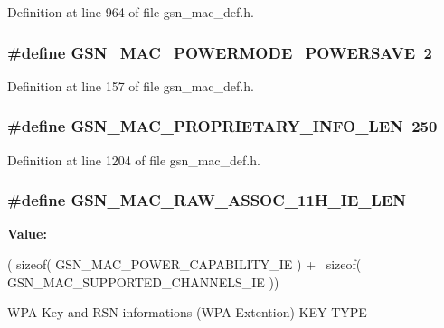 Definition at line 964 of file gsn\_\-mac\_\-def.h.

\hypertarget{a00522_ac27051c9054f9ce18951f1f2760ee99d}{
\subsubsection[{GSN\_\-MAC\_\-POWERMODE\_\-POWERSAVE}]{\setlength{\rightskip}{0pt plus 5cm}\#define GSN\_\-MAC\_\-POWERMODE\_\-POWERSAVE~2}}
\label{a00522_ac27051c9054f9ce18951f1f2760ee99d}


Definition at line 157 of file gsn\_\-mac\_\-def.h.

\hypertarget{a00522_acba15cc1684a86348849924ed0c4d0b1}{
\subsubsection[{GSN\_\-MAC\_\-PROPRIETARY\_\-INFO\_\-LEN}]{\setlength{\rightskip}{0pt plus 5cm}\#define GSN\_\-MAC\_\-PROPRIETARY\_\-INFO\_\-LEN~250}}
\label{a00522_acba15cc1684a86348849924ed0c4d0b1}


Definition at line 1204 of file gsn\_\-mac\_\-def.h.

\hypertarget{a00522_ad25b30f0499b7361d323e93f0393edd5}{
\subsubsection[{GSN\_\-MAC\_\-RAW\_\-ASSOC\_\-11H\_\-IE\_\-LEN}]{\setlength{\rightskip}{0pt plus 5cm}\#define GSN\_\-MAC\_\-RAW\_\-ASSOC\_\-11H\_\-IE\_\-LEN}}
\label{a00522_ad25b30f0499b7361d323e93f0393edd5}
{\bfseries Value:}
\begin{DoxyCode}
( sizeof( GSN_MAC_POWER_CAPABILITY_IE ) +  \
    sizeof( GSN_MAC_SUPPORTED_CHANNELS_IE ))
\end{DoxyCode}
WPA Key and RSN informations (WPA Extention) KEY TYPE 

